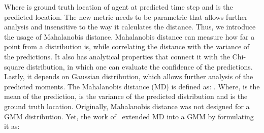\documentclass[runningheads]{llncs}
\begin{document}
Where  is ground truth location of agent  at predicted time step  and  is the predicted location.
The new metric needs to be parametric that allows further analysis and insensitive to the way it calculates the distance. Thus, we introduce the usage of Mahalanobis distance. Mahalanobis distance can measure how far a point from a distribution is, while correlating the distance with the variance of the predictions. It also has analytical properties that connect it with the Chi-square distribution, in which one can evaluate the confidence of the predictions. Lastly, it depends on Gaussian distribution, which allows further analysis of the predicted moments. The Mahalanobis distance (MD) is defined as:
.
Where,  is the mean of the prediction,  is the variance of the predicted distribution and  is the ground truth location.
Originally, Mahalanobis distance was not designed for a GMM distribution. Yet, the work of~\cite{tipping1999deriving} extended MD into a GMM by formulating it as:
\end{document}
